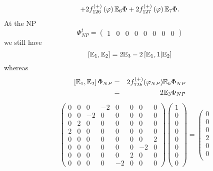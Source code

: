 \documentclass[a4paper,12pt]{book}
\begin{document}
\begin{itemize}
\begin{equation}
\begin{array}{lll}
+2f_{126}^{\left( +\right) }\left( \varphi \right) \Bbb{E}_{6}\Phi
+2f_{127}^{\left( +\right) }\left( \varphi \right) \Bbb{E}_{7}\Phi .
\end{array}
\label{soft}
\end{equation}
At the NP 
\begin{equation}
\Phi _{NP}^{t}=\left( 
\begin{array}{llllllll}
1 & 0 & 0 & 0 & 0 & 0 & 0 & 0
\end{array}
\right)
\end{equation}
we still have 
\begin{equation}
\left[ \Bbb{E}_{1},\Bbb{E}_{2}\right] =2\Bbb{E}_{3}-2\left[ \Bbb{E}_{1},1|%
\Bbb{E}_{2}\right]
\end{equation}
whereas 
\begin{eqnarray*}
\left[ \Bbb{E}_{1},\Bbb{E}_{2}\right] \Phi _{NP} &=&2f_{12k}^{\left(
+\right) }(\varphi _{NP})\Bbb{E}_{k}\Phi _{NP} \\
&=&2\Bbb{E}_{3}\Phi _{NP}
\end{eqnarray*}
\begin{eqnarray*}
&&\left( 
\begin{array}{llllllll}
0 & 0 & 0 & -2 & 0 & 0 & 0 & 0 \\ 
0 & 0 & -2 & 0 & 0 & 0 & 0 & 0 \\ 
0 & 2 & 0 & 0 & 0 & 0 & 0 & 0 \\ 
2 & 0 & 0 & 0 & 0 & 0 & 0 & 0 \\ 
0 & 0 & 0 & 0 & 0 & 0 & 0 & 2 \\ 
0 & 0 & 0 & 0 & 0 & 0 & -2 & 0 \\ 
0 & 0 & 0 & 0 & 0 & 2 & 0 & 0 \\ 
0 & 0 & 0 & 0 & -2 & 0 & 0 & 0
\end{array}
\right) \left( 
\begin{array}{l}
1 \\ 
0 \\ 
0 \\ 
0 \\ 
0 \\ 
0 \\ 
0 \\ 
0
\end{array}
\right) =\left( 
\begin{array}{l}
0 \\ 
0 \\ 
0 \\ 
2 \\ 
0 \\ 
0 \\ 

\end{array}
\end{eqnarray*}
\end{itemize}
\end{document}
